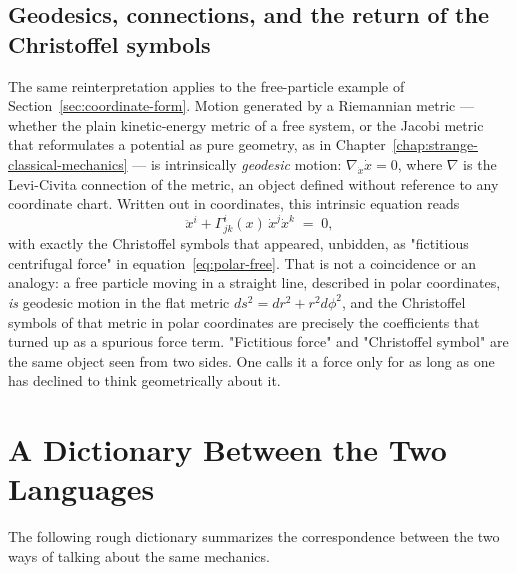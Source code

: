 \subsection{Geodesics, connections, and the return of the Christoffel symbols}

The same reinterpretation applies to the free-particle example of
Section~\ref{sec:coordinate-form}. Motion generated by a Riemannian
metric --- whether the plain kinetic-energy metric of a free system,
or the Jacobi metric that reformulates a potential as pure geometry,
as in Chapter~\ref{chap:strange-classical-mechanics} --- is
intrinsically \emph{geodesic} motion: $\nabla_{\dot x}\dot x = 0$,
where $\nabla$ is the Levi-Civita connection of the metric, an
object defined without reference to any coordinate chart. Written
out in coordinates, this intrinsic equation reads
\begin{equation}
  \ddot x^i + \Gamma^i_{jk}(x)\,\dot x^j \dot x^k \;=\; 0,
  \label{eq:geodesic-coord}
\end{equation}
with exactly the Christoffel symbols that appeared, unbidden, as
"fictitious centrifugal force" in equation~\eqref{eq:polar-free}.
That is not a coincidence or an analogy: a free particle moving in a
straight line, described in polar coordinates, \emph{is} geodesic
motion in the flat metric $ds^2 = dr^2 + r^2 d\phi^2$, and the
Christoffel symbols of that metric in polar coordinates are precisely
the coefficients that turned up as a spurious force term. "Fictitious
force" and "Christoffel symbol" are the same object seen from two
sides. One calls it a force only for as long as one has declined to
think geometrically about it.

\section{A Dictionary Between the Two Languages}

The following rough dictionary summarizes the correspondence between
the two ways of talking about the same mechanics.

